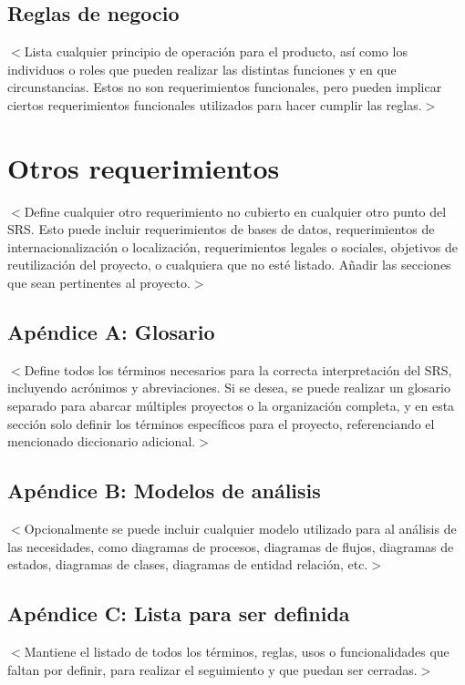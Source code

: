 \documentclass{scrreprt}
\begin{document}
\section{Reglas de negocio}
$<$Lista cualquier principio de operación para el producto, así como los individuos
o roles que pueden realizar las distintas funciones y en que circunstancias. Estos
no son requerimientos funcionales, pero pueden implicar ciertos requerimientos
funcionales utilizados para hacer cumplir las reglas.$>$

\chapter{Otros requerimientos}
$<$Define cualquier otro requerimiento no cubierto en cualquier otro punto del SRS.
Esto puede incluir requerimientos de bases de datos, requerimientos de internacionalización
o localización, requerimientos legales o sociales, objetivos de reutilización del
proyecto, o cualquiera que no esté listado. Añadir las secciones que sean pertinentes
al proyecto.$>$ 

\section{Apéndice A: Glosario}
$<$Define todos los términos necesarios para la correcta interpretación del SRS, 
incluyendo acrónimos y abreviaciones. Si se desea, se puede realizar un glosario
separado para abarcar múltiples proyectos o la organización completa, y en esta 
sección solo definir los términos específicos para el proyecto, referenciando el 
mencionado diccionario adicional.$>$

\section{Apéndice B: Modelos de análisis}
$<$Opcionalmente se puede incluir cualquier modelo utilizado para al análisis de
las necesidades, como diagramas de procesos, diagramas de flujos, diagramas de estados,
diagramas de clases, diagramas de entidad relación, etc.$>$

\section{Apéndice C: Lista para ser definida}
$<$Mantiene el listado de todos los términos, reglas, usos o funcionalidades que
faltan por definir, para realizar el seguimiento y que puedan ser cerradas.$>$
\end{document}
